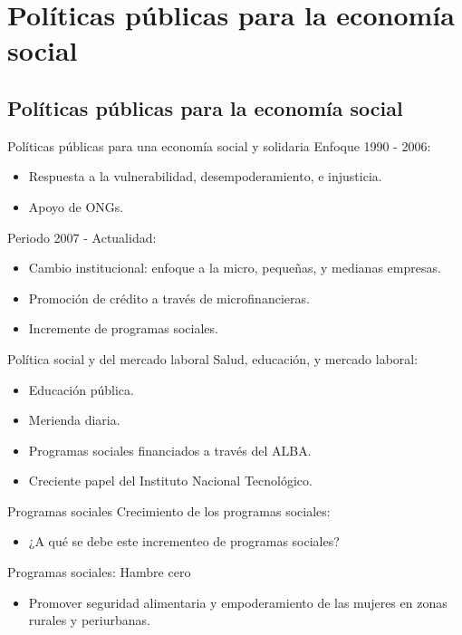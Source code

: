 \documentclass[11pt, aspectratio=169, compress]{beamer}
\begin{document}
\section{Políticas públicas para la economía social}
\subsection{Políticas públicas para la economía social}
\begin{frame}{Políticas públicas para una economía social y solidaria}
Enfoque 1990 - 2006: 
\begin{itemize}
	\item Respuesta a la vulnerabilidad, desempoderamiento, e injusticia. 
	\item Apoyo de ONGs. 
\end{itemize}
Periodo 2007 - Actualidad: 
\begin{itemize}
	\item Cambio institucional: enfoque a la micro, pequeñas, y medianas empresas. 
	\item Promoción de crédito a través de microfinancieras. 
	\item Incremente de programas sociales. 
\end{itemize}
\end{frame}
\begin{frame}{Política social y del mercado laboral}
Salud, educación, y mercado laboral:
\begin{itemize}
	\item Educación pública. 
	\item Merienda diaria. 
	\item Programas sociales financiados a través del ALBA. 
	\item Creciente papel del Instituto Nacional Tecnológico. 
\end{itemize}	
\end{frame}
\begin{frame}{Programas sociales}
Crecimiento de los programas sociales:
\begin{itemize}
	\item ¿A qué se debe este incrementeo de programas sociales? 
\end{itemize}
\end{frame}
\begin{frame}{Programas sociales: Hambre cero}
\begin{itemize}
	\item Promover seguridad alimentaria y empoderamiento de las mujeres en zonas rurales y periurbanas. 
\end{itemize}
\end{frame}
\end{document}
